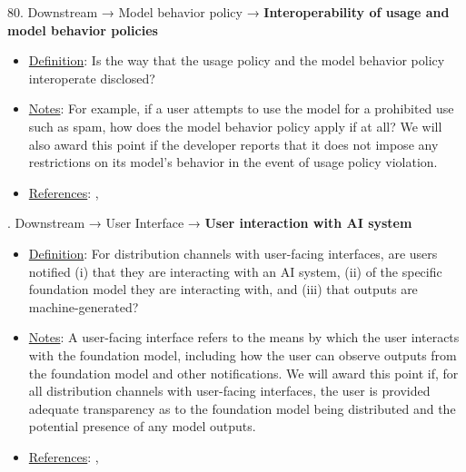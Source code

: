 80. Downstream → Model behavior policy → \textbf{Interoperability of usage and model behavior policies}
\vspace{-\parskip}
\begin{itemize}
\item
\underline{Definition}: Is the way that the usage policy and the model behavior policy interoperate disclosed?
\item
\underline{Notes}: For example, if a user attempts to use the model for a prohibited use such as spam, how does the model behavior policy apply if at all? We will also award this point if the developer reports that it does not impose any restrictions on its model's behavior in the event of usage policy violation.
\item
\underline{References}: \citet{reuter2023im}, \citet{qi2023finetuning}
\end{itemize} \vspace{\baselineskip}


. Downstream → User Interface → \textbf{User interaction with AI system}
\vspace{-\parskip}
\begin{itemize}
\item
\underline{Definition}: For distribution channels with user-facing interfaces, are users notified (i) that they are interacting with an AI system, (ii) of the specific foundation model they are interacting with, and (iii) that outputs are machine-generated?
\item
\underline{Notes}: A user-facing interface refers to the means by which the user interacts with the foundation model, including how the user can observe outputs from the foundation model and other notifications. We will award this point if, for all distribution channels with user-facing interfaces, the user is provided adequate transparency as to the foundation model being distributed and the potential presence of any model outputs.
\item
\underline{References}: \citet{qiaosi2023ux}, \citet{nakao2022responsible}
\end{itemize} \vspace{\baselineskip}


